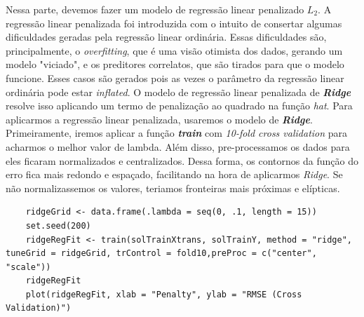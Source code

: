 \documentclass[a4paper,11pt]{article}
\begin{document}
	Nessa parte, devemos fazer um modelo de regressão linear penalizado $L_{2}$.
	A regressão linear penalizada foi introduzida com o intuito de consertar algumas dificuldades geradas pela regressão linear ordinária. Essas dificuldades são, principalmente, o \textit{overfitting}, que é uma visão otimista dos dados, gerando um modelo "viciado", e os preditores correlatos, que são tirados para que o modelo funcione. Esses casos são gerados pois as vezes o parâmetro da regressão linear ordinária pode estar \textit{inflated}. O modelo de regressão linear penalizada de \textit{\textbf{Ridge}} resolve isso aplicando um termo de penalização ao quadrado na função \textit{hat}.
	Para aplicarmos a regressão linear penalizada, usaremos o modelo de \textit{\textbf{Ridge}}. Primeiramente, iremos aplicar a função \textit{\textbf{train}} com \textit{10-fold cross validation} para acharmos o melhor valor de lambda. Além disso, pre-processamos os dados para eles ficaram normalizados e centralizados. Dessa forma, os contornos da função do erro fica mais redondo e espaçado, facilitando na hora de aplicarmos \textit{Ridge}. Se não normalizassemos os valores, teriamos fronteiras mais próximas e elípticas.
	\begin{verbatim}
	ridgeGrid <- data.frame(.lambda = seq(0, .1, length = 15))
	set.seed(200)
	ridgeRegFit <- train(solTrainXtrans, solTrainY, method = "ridge", tuneGrid = ridgeGrid, trControl = fold10,preProc = c("center", "scale"))
	ridgeRegFit
	plot(ridgeRegFit, xlab = "Penalty", ylab = "RMSE (Cross Validation)")
	\end{verbatim}
\end{document}
